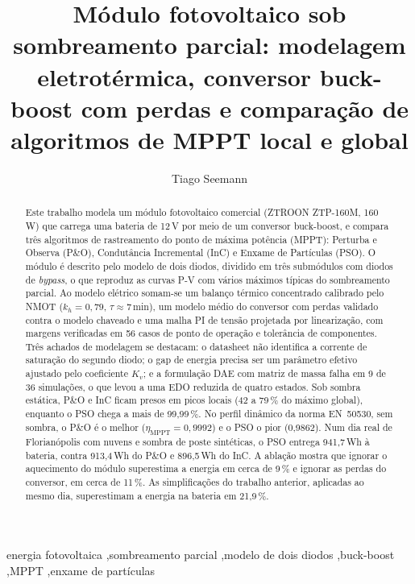 \documentclass[3p,authoryear]{elsarticle}
\newcommand{\etaM}{\eta_{\mathrm{MPPT}}}
\begin{document}
\begin{frontmatter}

\title{Módulo fotovoltaico sob sombreamento parcial: modelagem eletrotérmica,
conversor buck-boost com perdas e comparação de algoritmos de MPPT local e global}

\author{Tiago Seemann}
\address{Universidade Federal de Santa Catarina, Departamento de Automação e Sistemas,
Florianópolis, Santa Catarina, Brasil}

\begin{abstract}
Este trabalho modela um módulo fotovoltaico comercial (ZTROON ZTP-160M, 160\,W) que carrega
uma bateria de 12\,V por meio de um conversor buck-boost, e compara três algoritmos de
rastreamento do ponto de máxima potência (MPPT): Perturba e Observa (P\&O), Condutância
Incremental (InC) e Enxame de Partículas (PSO). O módulo é descrito pelo modelo de dois
diodos, dividido em três submódulos com diodos de \emph{bypass}, o que reproduz as curvas
P-V com vários máximos típicas do sombreamento parcial. Ao modelo elétrico somam-se um
balanço térmico concentrado calibrado pelo NMOT ($k_h = 0{,}79$, $\tau \approx 7$\,min), um
modelo médio do conversor com perdas validado contra o modelo chaveado e uma malha PI de
tensão projetada por linearização, com margens verificadas em 56 casos de ponto de operação
e tolerância de componentes. Três achados de modelagem se destacam: o datasheet não
identifica a corrente de saturação do segundo diodo; o gap de energia precisa ser um
parâmetro efetivo ajustado pelo coeficiente $K_v$; e a formulação DAE com matriz de massa
falha em 9 de 36 simulações, o que levou a uma EDO reduzida de quatro estados. Sob sombra
estática, P\&O e InC ficam presos em picos locais (42 a 79\,\% do máximo global), enquanto o
PSO chega a mais de 99,99\,\%. No perfil dinâmico da norma EN~50530, sem sombra, o P\&O é o
melhor ($\etaM = 0{,}9992$) e o PSO o pior (0,9862). Num dia real de Florianópolis com
nuvens e sombra de poste sintéticas, o PSO entrega 941,7\,Wh à bateria, contra 913,4\,Wh do
P\&O e 896,5\,Wh do InC. A ablação mostra que ignorar o aquecimento do módulo superestima a
energia em cerca de 9\,\% e ignorar as perdas do conversor, em cerca de 11\,\%. As
simplificações do trabalho anterior, aplicadas ao mesmo dia, superestimam a energia na
bateria em 21,9\,\%.
\end{abstract}

\begin{keyword}
energia fotovoltaica \sep sombreamento parcial \sep modelo de dois diodos \sep buck-boost
\sep MPPT \sep enxame de partículas
\end{keyword}

\end{frontmatter}
\end{document}
